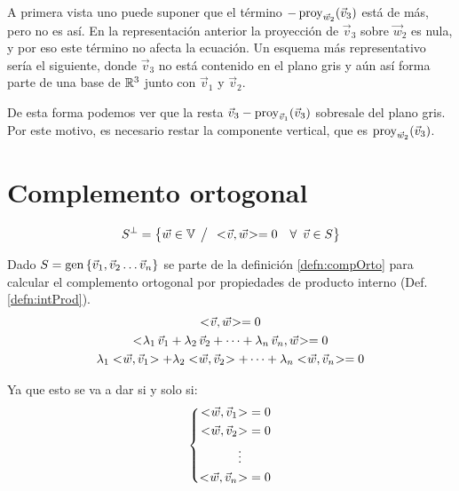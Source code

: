 A primera vista uno puede suponer que el término $-\operatorname{proy}_{\Vec{w}_2}(\Vec{v}_3)$ está de más, pero no es así.
En la representación anterior la proyección de $\Vec{v}_3$ sobre $\Vec{w}_2$ es nula, y por eso este término no afecta la ecuación.
Un esquema más representativo sería el siguiente, donde $\Vec{v}_3$ no está contenido en el plano gris y aún así forma parte de una base de $\mathbb{R}^3$ junto con $\Vec{v}_1$ y $\Vec{v}_2$.

\begin{center}
    \def\svgwidth{0.7\linewidth}
    
\end{center}

De esta forma podemos ver que la resta $\Vec{v}_3-\operatorname{proy}_{\Vec{v}_1}(\Vec{v}_3)$ sobresale del plano gris.
Por este motivo, es necesario restar la componente vertical, que es $\operatorname{proy}_{\Vec{w}_2}(\Vec{v}_3)$.


\section{Complemento ortogonal}

\begin{mdframed}[style=DefinitionFrame]
    \begin{defn}
        \label{defn:compOrto}
    \end{defn}
    \begin{equation*}
        S^\perp = { \left\{ {\Vec{w} \in \mathbb{V} \hspace{1ex} \big/ \hspace{1ex} <\hspace{-0.8mm}\Vec{v},\Vec{w}\hspace{-0.8mm}> = 0 \quad \forall \enspace \Vec{v} \in S} \right\} }
    \end{equation*}
\end{mdframed}

Dado $S=\operatorname{gen}{ \left\{ {\Vec{v}_1,\Vec{v}_2 \dots \Vec{v}_n} \right\} }$ se parte de la definición \ref{defn:compOrto} para calcular el complemento ortogonal por propiedades de producto interno (Def. \ref{defn:intProd}).
\begin{gather*}
    \intProd{\Vec{v}}{\Vec{w}} = 0
    \\
    \intProd{\lambda_1 \, \Vec{v}_1 + \lambda_2 \, \Vec{v}_2 + \dots + \lambda_\nth \, \Vec{v}_\nth}{\Vec{w}} = 0
    \\
    \lambda_1 \intProd{\Vec{w}}{\Vec{v}_1} + \lambda_2 \intProd{\Vec{w}}{\Vec{v}_2} + \dots + \lambda_\nth \intProd{\Vec{w}}{\Vec{v}_\nth} = 0
\end{gather*}

Ya que esto se va a dar si y solo si:
\begin{equation*}
    \left\{
    \begin{aligned}
        <\hspace{-0.8mm}\Vec{w},\Vec{v}_1\hspace{-0.8mm}> &= 0
        \\
        <\hspace{-0.8mm}\Vec{w},\Vec{v}_2\hspace{-0.8mm}> &= 0
        \\
        \vdots \enspace &
        \\
        <\hspace{-0.8mm}\Vec{w},\Vec{v}_n\hspace{-0.8mm}> &= 0
    \end{aligned}
    \right.
\end{equation*}

